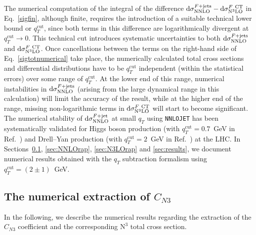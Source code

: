\documentclass[12pt]{article}
\DeclareRobustCommand{\qt}{\ensuremath{q_T}\xspace}
\DeclareRobustCommand{\qtcut}{\ensuremath{q_T^\mathrm{cut}}\xspace}
\DeclareRobustCommand{\rd}{\ensuremath{\mathrm{d}}}
\DeclareRobustCommand{\LO}{\text{LO}\xspace}
\DeclareRobustCommand{\N}[1]{\ensuremath{\text{N}^{#1}}} %
\begin{document}
The numerical computation of the integral of the difference $\rd{\sigma}_{\rm{NNLO}}^{F+{\rm jets}}-\rd{\sigma}_{\rm{N}^3\rm{LO}}^{F {\rm\ CT}}$ in Eq.~\eqref{sigfin}, although finite, requires the introduction of a suitable technical lower bound or $\qtcut$, since both terms in this difference are logarithmically divergent at $\qtcut \to 0$. 
 This technical cut introduces systematic uncertainties to both $\rd{\sigma}_{\rm{NNLO}}^{F+{\rm jets}}$ and $\rd{\sigma}_{\rm{N}^3\rm{LO}}^{F {\rm\ CT}}$. Once cancellations between the terms on the right-hand side of Eq.~\eqref{sigtotnumerical} take place, the numerically calculated total cross sections and differential distributions have to be $\qtcut$ independent (within the statistical errors) over some range of $\qtcut$. At the lower end of this range, 
numerical instabilities in $\rd{\sigma}_{\rm{NNLO}}^{F+{\rm jets}}$ (arising from the large dynamical range in this calculation) 
will limit the accuracy of the result, while at the 
higher end of the range, missing non-logarithmic terms in  $\rd{\sigma}_{\rm{N}^3\rm{LO}}^{F {\rm\ CT}}$ will start to 
become significant. 
The numerical stability of $\rd{\sigma}_{\rm{NNLO}}^{F+{\rm jet}}$ at small $\qt$ using \texttt{NNLOJET} has been systematically validated for Higgs boson production (with $\qtcut=0.7$~GeV in Ref.~\cite{Chen:2018pzu}) and Drell--Yan production (with $\qtcut=2$~GeV in Ref.~\cite{Bizon:2018foh}) at the LHC. In Sections~\ref{sec:numCN3}, \ref{sec:NNLOrap}, \ref{sec:N3LOrap} and \ref{sec:results}, we document numerical results obtained with the $\qt$ subtraction formalism using $\qtcut=(2\pm 1)$~GeV.



\subsection{The numerical extraction of \texorpdfstring{$C_{N3}$}{CN3}}
\label{sec:numCN3}

In the following, we describe the numerical results regarding the extraction of the $C_{N3}$ coefficient and the corresponding \N3\LO total cross section. 
\end{document}
